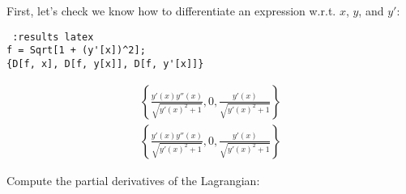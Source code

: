 First, let's check we know how to differentiate an expression w.r.t. $x$, $y$, and $y'$:

\begin{verbatim} :results latex
f = Sqrt[1 + (y'[x])^2];
{D[f, x], D[f, y[x]], D[f, y'[x]]}
\end{verbatim}

\begin{align*}
\left\{\frac{y'(x) y''(x)}{\sqrt{y'(x)^2+1}},0,\frac{y'(x)}{\sqrt{y'(x)^2+1}}\right\}
\end{align*}
\begin{align*}
\left\{\frac{y'(x) y''(x)}{\sqrt{y'(x)^2+1}},0,\frac{y'(x)}{\sqrt{y'(x)^2+1}}\right\}
\end{align*}

Compute the partial derivatives of the Lagrangian:














